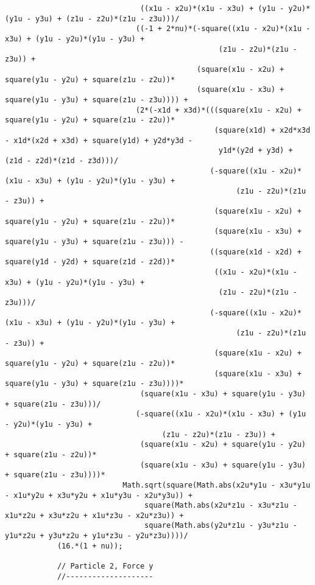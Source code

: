 \begin{lstlisting}
							   ((x1u - x2u)*(x1u - x3u) + (y1u - y2u)*(y1u - y3u) + (z1u - z2u)*(z1u - z3u)))/
							  ((-1 + 2*nu)*(-square((x1u - x2u)*(x1u - x3u) + (y1u - y2u)*(y1u - y3u) + 
												 (z1u - z2u)*(z1u - z3u)) + 
											(square(x1u - x2u) + square(y1u - y2u) + square(z1u - z2u))*
											(square(x1u - x3u) + square(y1u - y3u) + square(z1u - z3u)))) + 
							  (2*(-x1d + x3d)*(((square(x1u - x2u) + square(y1u - y2u) + square(z1u - z2u))*
												(square(x1d) + x2d*x3d - x1d*(x2d + x3d) + square(y1d) + y2d*y3d - 
												 y1d*(y2d + y3d) + (z1d - z2d)*(z1d - z3d)))/
											   (-square((x1u - x2u)*(x1u - x3u) + (y1u - y2u)*(y1u - y3u) + 
													 (z1u - z2u)*(z1u - z3u)) + 
												(square(x1u - x2u) + square(y1u - y2u) + square(z1u - z2u))*
												(square(x1u - x3u) + square(y1u - y3u) + square(z1u - z3u))) - 
											   ((square(x1d - x2d) + square(y1d - y2d) + square(z1d - z2d))*
												((x1u - x2u)*(x1u - x3u) + (y1u - y2u)*(y1u - y3u) + 
												 (z1u - z2u)*(z1u - z3u)))/
											   (-square((x1u - x2u)*(x1u - x3u) + (y1u - y2u)*(y1u - y3u) + 
													 (z1u - z2u)*(z1u - z3u)) + 
												(square(x1u - x2u) + square(y1u - y2u) + square(z1u - z2u))*
												(square(x1u - x3u) + square(y1u - y3u) + square(z1u - z3u))))*
							   (square(x1u - x3u) + square(y1u - y3u) + square(z1u - z3u)))/
							  (-square((x1u - x2u)*(x1u - x3u) + (y1u - y2u)*(y1u - y3u) + 
									(z1u - z2u)*(z1u - z3u)) + 
							   (square(x1u - x2u) + square(y1u - y2u) + square(z1u - z2u))*
							   (square(x1u - x3u) + square(y1u - y3u) + square(z1u - z3u))))*
						   Math.sqrt(square(Math.abs(x2u*y1u - x3u*y1u - x1u*y2u + x3u*y2u + x1u*y3u - x2u*y3u)) + 
								square(Math.abs(x2u*z1u - x3u*z1u - x1u*z2u + x3u*z2u + x1u*z3u - x2u*z3u)) + 
								square(Math.abs(y2u*z1u - y3u*z1u - y1u*z2u + y3u*z2u + y1u*z3u - y2u*z3u))))/
			(16.*(1 + nu));
			
			// Particle 2, Force y
			//--------------------
			

\end{lstlisting}
